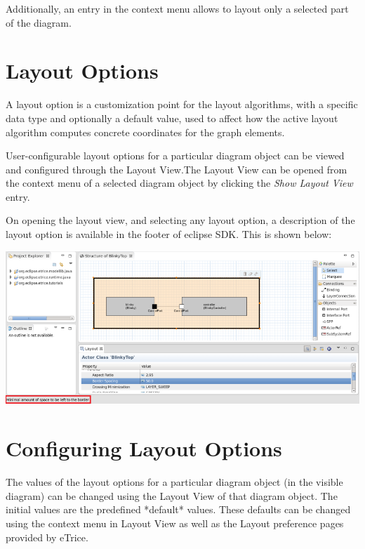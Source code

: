 Additionally, an entry in the context menu allows to layout only a selected part of the diagram.

\section{\label{layoutOptions}Layout Options}

A layout option is a customization point for the layout algorithms, with a specific data type and optionally a default value, used to affect how the active layout algorithm computes concrete coordinates for the graph elements.

User-configurable layout options for a particular diagram object can be viewed and configured through the Layout View.The Layout View can be opened from the context menu of a selected diagram object by clicking the \textit{Show Layout View} entry. 

On opening the layout view, and selecting any layout option, a description of the layout option is available in the footer of eclipse SDK. This is shown below:

\includegraphics[width=\linewidth]{images/043-LayoutOptionDescription.png}

\section{\label{configureOptions}Configuring Layout Options}

The values of the layout options for a particular diagram object (in the visible diagram) can be changed using the Layout View of that diagram object. The initial values are the predefined *default* values. These defaults can be changed using the context menu in Layout View as well as the Layout preference pages provided by eTrice.

